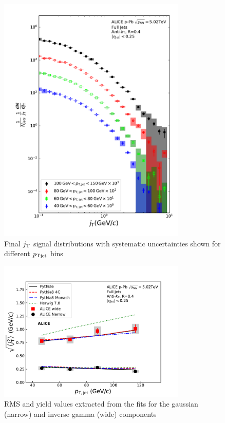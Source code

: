 \begin{figure}[htb]
\begin{center}
\includegraphics[width=0.8\textwidth]{figures/results/jTwithSystematics.pdf}
\caption{Final $j_{\rm T}$ signal distributions with systematic uncertainties shown for different $p_{\rm Tjet}$ bins}
\label{fig:jt_systematics}
\end{center}
\end{figure}


\begin{figure}[htb]
\begin{center}
\includegraphics[width=0.8\textwidth]{figures/results/RMSWithSystematics_Pythia.pdf}
\caption{RMS and yield values extracted from the fits for the gaussian (narrow) and inverse gamma (wide) components}
\label{fig:rms_models}
\end{center}
\end{figure}

